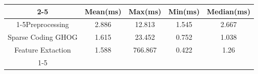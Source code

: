 \documentclass{standalone}
\begin{document}
 
 \begin{tabular}{|c |c |c |c |c |}
\cline{2-5}\cline{2-5} \multicolumn{1}{c |}{ } & Mean(ms) & Max(ms) & Min(ms) & Median(ms)\\ 
\cline{1-5}Preprocessing & 2.886 & 12.813 & 1.545 & 2.667\\ 
 \hhline{|=|=|=|=|=|}Sparse Coding GHOG & 1.615 & 23.452 & 0.752 & 1.038\\ 
 \hhline{|=|=|=|=|=|}Feature Extaction & 1.588 & 766.867 & 0.422 & 1.26\\ 
 \cline{1-5}\hline \end{tabular}
 
\end{document}
